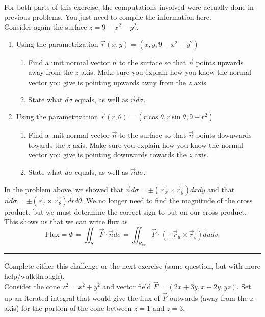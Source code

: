 \begin{problem}
For both parts of this exercise, the computations involved were actually done in previous problems. You just need to compile the information here.\\

Consider again the surface $z=9-x^2-y^2$. 
\begin{enumerate}
	\item Using the parametrization $\vec r(x,y) =(x,y,9-x^2-y^2)$
	\begin{enumerate}
		\item Find a unit normal vector $\vec n$ to the surface so that $\vec n$ points upwards away from the $z$-axis. Make sure you explain how you know the normal vector you give is pointing upwards away from the $z$ axis.
		\item State what $d\sigma$ equals, as well as $\vec n d\sigma$.
	\end{enumerate}
	\item Using the parametrization $\vec r(r,\theta) =(r\cos \theta,r\sin\theta ,9-r^2)$
	\begin{enumerate}
		\item Find a unit normal vector $\vec n$ to the surface so that $\vec n$ points downwards towards the $z$-axis. Make sure you explain how you know the normal vector you give is pointing downwards towards the $z$ axis.
		\item State what $d\sigma$ equals, as well as $\vec n d\sigma$.
	\end{enumerate}

\end{enumerate}

\end{problem}


In the problem above, we showed that $\vec n d\sigma = \pm(\vec r_x\times\vec r_y)dxdy$ and that $\vec n d\sigma = \pm(\vec r_r\times\vec r_\theta)drd\theta$.  We no longer need to find the magnitude of the cross product, but we must determine the correct sign to put on our cross product.  This shows us that we can write flux as 
$$\text{Flux}=\Phi 
= \iint_S \vec F\cdot \vec n d\sigma 
= \iint_{R_{uv}} \vec F\cdot (\pm \vec r_u\times \vec r_v) dudv
.$$

\hrule



\begin{challenge}
Complete either this challenge or the next exercise (same question, but with more help/walkthrough).\\
Consider the cone $z^2=x^2+y^2$ and vector field $\vec F = (2x+3y, x-2y, yz)$. Set up an iterated integral that would give the flux of $\vec F$ outwards (away from the $z$-axis) for the portion of the cone between $z=1$ and $z=3$.
\end{challenge}

